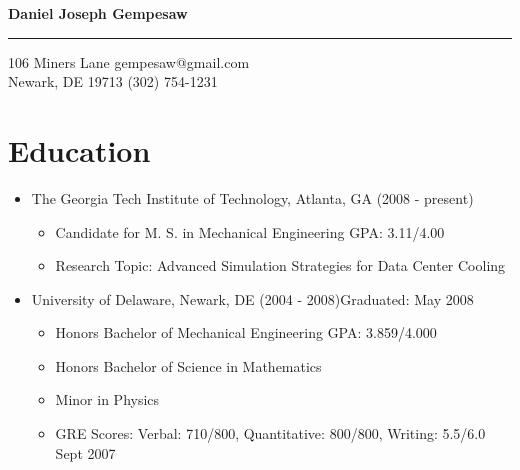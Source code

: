 \documentclass[10pt]{article}
\newenvironment{myitem}{
\begin{itemize}
  \setlength{\itemsep}{1pt}
  \setlength{\parskip}{0pt}
  \setlength{\parsep}{0pt}
}{\end{itemize}}
\begin{document}
\begin{center} \Large \textbf{Daniel Joseph Gempesaw} \end{center} 
\hrule \vspace{0.2 cm}
\normalsize
106 Miners Lane \hfill gempesaw@gmail.com\\
Newark, DE 19713 \hfill (302) 754-1231\\
\vspace{-.60 cm}
%
\section{Education}
\vspace{-0.25cm}
\begin{myitem}
\item The Georgia Tech Institute of Technology, Atlanta, GA \hfill (2008 - present)
\begin{myitem}
\item Candidate for M. S. in Mechanical Engineering \hfill GPA: 3.11/4.00
\item Research Topic: Advanced Simulation Strategies for Data Center Cooling
\end{myitem}
\item University of Delaware, Newark, DE (2004 - 2008)\hfill Graduated: May 2008
\begin{myitem}
\item Honors Bachelor of Mechanical Engineering \hfill GPA: 3.859/4.000
\item Honors Bachelor of Science in Mathematics
\item Minor in Physics
\item GRE Scores: Verbal: 710/800, Quantitative: 800/800, Writing: 5.5/6.0 \hfill Sept 2007
\end{myitem}
\end{myitem}
%
%
%
%
\vspace{-0.45 cm}
\end{document}
